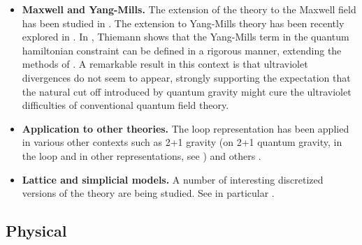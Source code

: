 \begin{itemize}
\item {\bf Maxwell and Yang-Mills.  } The extension of the theory to 
the Maxwell field has been studied in 
\cite{Krasnov95,GambiniPullin93}.  The extension to Yang-Mills theory 
has been recently explored in \cite{ThiemannYM}.  In 
\cite{ThiemannYM}, Thiemann shows that the Yang-Mills term in the 
quantum hamiltonian constraint can be defined in a rigorous manner, 
extending the methods of \cite{Thiemann96,Thiemann96b,Thiemann96c}.  A 
remarkable result in this context is that ultraviolet divergences do 
not seem to appear, strongly supporting the expectation that the 
natural cut off introduced by quantum gravity might cure the 
ultraviolet difficulties of conventional quantum field theory.

\item {\bf Application to other theories.  } The loop 
representation has been applied in various other contexts such as 
2+1 gravity \cite{AshtekarEtAl89,Marolf93,AshtekarLoll} (on 2+1 
quantum gravity, in the loop and in other representations, see 
\cite{Carlip}) and others \cite{AshtekarRovelli}.

\item {\bf Lattice and simplicial models.  } A number of 
interesting discretized versions of the theory are being studied.  
See in particular 
\cite{Loll95a,Reisenberger,GambiniPullin,GambiniLattice}.

\end{itemize}
 
       \subsection{Physical}\label{physical}

